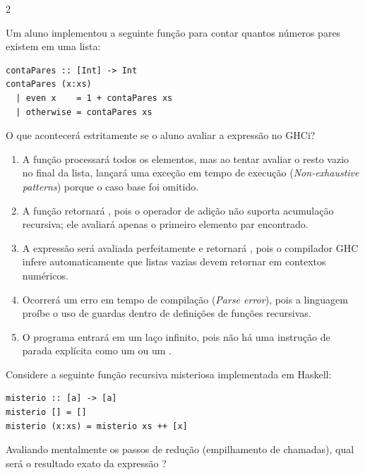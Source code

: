 \documentclass[a4paper,10pt,brazil]{article}
\begin{document}
\begin{multicols}{2}
\begin{enumerate}
\end{enumerate}

Um aluno implementou a seguinte função para contar quantos números pares existem em uma lista:

\begin{verbatim}
contaPares :: [Int] -> Int
contaPares (x:xs)
  | even x    = 1 + contaPares xs
  | otherwise = contaPares xs
\end{verbatim}

O que acontecerá estritamente se o aluno avaliar a expressão  no GHCi?

\begin{enumerate}
  \item A função processará todos os elementos, mas ao tentar avaliar o resto vazio no final da lista, lançará uma exceção em tempo de execução (\emph{Non-exhaustive patterns}) porque o caso base  foi omitido.

  \item A função retornará , pois o operador de adição não suporta acumulação recursiva; ele avaliará apenas o primeiro elemento par encontrado.

  \item A expressão será avaliada perfeitamente e retornará , pois o compilador GHC infere automaticamente que listas vazias devem retornar  em contextos numéricos.

  \item Ocorrerá um erro em tempo de compilação (\emph{Parse error}), pois a linguagem proíbe o uso de guardas dentro de definições de funções recursivas.

  \item O programa entrará em um laço infinito, pois não há uma instrução de parada explícita como um  ou um .


\end{enumerate}

Considere a seguinte função recursiva misteriosa implementada em Haskell:

\begin{verbatim}
misterio :: [a] -> [a]
misterio [] = []
misterio (x:xs) = misterio xs ++ [x]
\end{verbatim}

Avaliando mentalmente os passos de redução (empilhamento de chamadas), qual será o resultado exato da expressão ?


\end{multicols}
\end{document}
